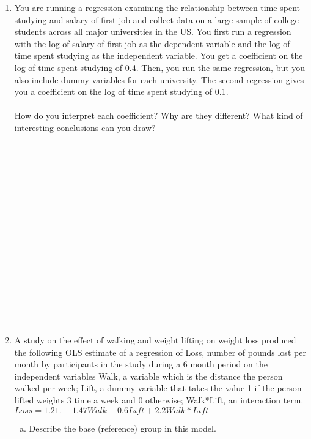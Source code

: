 \documentclass[12pt]{article}
\begin{document}
\begin{enumerate}[(1)]
\item You are running a regression examining the relationship between time spent studying and salary of first job and collect data on a large sample of college students across all major universities in the US. You first run a regression with the log of salary of first job as the dependent variable and the log of time spent studying as the independent variable. You get a coefficient on the log of time spent studying of 0.4. Then, you run the same regression, but you also include dummy variables for each university. The second regression gives you a coefficient on the log of time spent studying of 0.1.\\
\\
How do you interpret each coefficient? Why are they different? What kind of interesting conclusions can you draw?\\
\\
\\
\\
\\
\\
\\
\\
\\
\\
\\
\\
\\
\\
\\
\\
\\
\pagebreak
\item A study on the effect of walking and weight lifting on weight loss produced the following OLS estimate of a regression of Loss, number of pounds lost per month by participants in the study during a 6 month period on the independent variables Walk, a variable which is the distance the person walked per week; Lift, a dummy variable that takes the value 1 if the person lifted weights 3 time a week and 0 otherwise; Walk*Lift, an interaction term.\\
$Loss = 1.21.+ 1.47 Walk + 0.6 Lift + 2.2 Walk*Lift$\\
\begin{enumerate}[(a)]\\
\item Describe the base (reference) group in this model.\\
\\
\\
\\
\\

\end{enumerate}
\end{enumerate}
\end{document}

